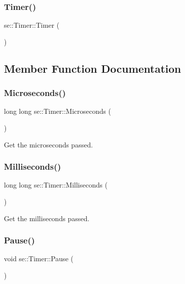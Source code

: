 \subsubsection{\texorpdfstring{Timer()}{Timer()}}
{\footnotesize\ttfamily se\+::\+Timer\+::\+Timer (\begin{DoxyParamCaption}{ }\end{DoxyParamCaption})}



\subsection{Member Function Documentation}
\mbox{\label{classse_1_1_timer_a7fdf38aafc8be894fc25764ff8cabb36}} 
\subsubsection{\texorpdfstring{Microseconds()}{Microseconds()}}
{\footnotesize\ttfamily long long se\+::\+Timer\+::\+Microseconds (\begin{DoxyParamCaption}{ }\end{DoxyParamCaption})}

Get the microseconds passed. \mbox{\label{classse_1_1_timer_a9c3fe064b6637f2804c370da786a38d8}} 
\subsubsection{\texorpdfstring{Milliseconds()}{Milliseconds()}}
{\footnotesize\ttfamily long long se\+::\+Timer\+::\+Milliseconds (\begin{DoxyParamCaption}{ }\end{DoxyParamCaption})}

Get the milliseconds passed. \mbox{\label{classse_1_1_timer_abde91d5d6e7fe0601c0c9607193707d8}} 
\subsubsection{\texorpdfstring{Pause()}{Pause()}}
{\footnotesize\ttfamily void se\+::\+Timer\+::\+Pause (\begin{DoxyParamCaption}{ }\end{DoxyParamCaption})}

